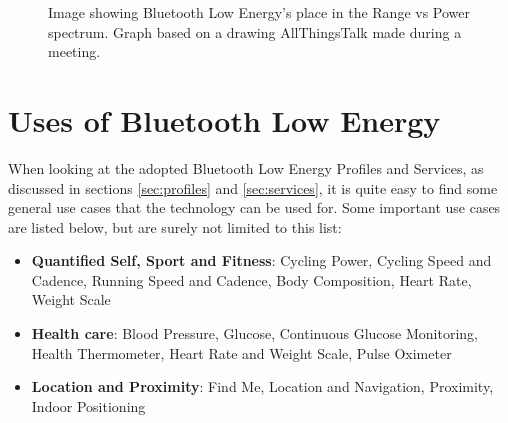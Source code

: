 \documentclass[pdftex,a4paper,12pt,twoside]{report}
\begin{document}
\begin{figure}[h]
\centering
{} 

\caption[Image showing Bluetooth Low Energy's place in the Range vs Power spectrum]{Image showing Bluetooth Low Energy's place in the Range vs Power spectrum. Graph based on a drawing AllThingsTalk made during a meeting.}
\label{fig:powerrange}

\end{figure}

\newpage{}

\section{Uses of Bluetooth Low Energy}
\label{sec:usesble}
When looking at the adopted Bluetooth Low Energy Profiles and Services, as discussed in sections \ref{sec:profiles} and \ref{sec:services}, it is quite easy to find some general use cases that the technology can be used for. Some important use cases are listed below, but are surely not limited to this list:

\begin{itemize}
	\item{\textbf{Quantified Self, Sport and Fitness}: Cycling Power, Cycling Speed and Cadence, Running Speed and Cadence, Body Composition, Heart Rate, Weight Scale}
	\item{\textbf{Health care}: Blood Pressure, Glucose, Continuous Glucose Monitoring, Health Thermometer, Heart Rate and Weight Scale, Pulse Oximeter}
	\item{\textbf{Location and Proximity}: Find Me, Location and Navigation, Proximity, Indoor Positioning}
\end{itemize}
\end{document}
